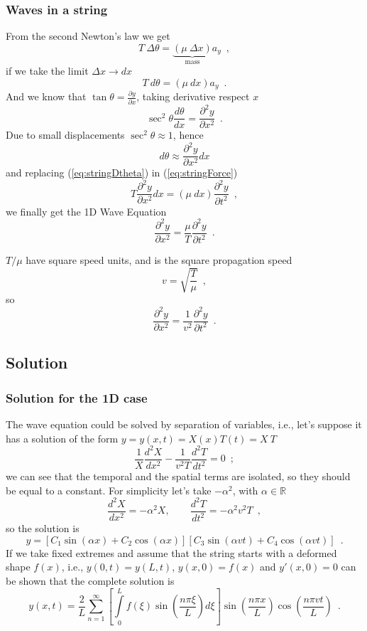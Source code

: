 \documentclass{beamer}
\begin{document}
\begin{frame}[allowframebreaks]\frametitle{Waves in a string}		
From the second Newton's law we get
\[T\ \Delta \theta = \underbrace{(\mu\ \Delta x)}_\text{mass} a_y \enspace ,\]
if we take the limit $\Delta x \rightarrow dx$
\begin{equation}
T\ d\theta = (\mu\ dx) a_y \enspace .
\label{eq:stringForce}
\end{equation}
And we know that $\tan \theta = \frac{\partial y}{\partial x}$, taking derivative respect $x$
\[\sec^2 \theta \frac{d\theta}{dx} = \frac{\partial^2 y}{\partial x^2} \enspace .\]
Due to small displacements $\sec^2 \theta \approx 1$, hence
\begin{equation}
d\theta \approx \frac{\partial^2 y}{\partial x^2} dx
\label{eq:stringDtheta}
\end{equation}
and replacing (\ref{eq:stringDtheta}) in  (\ref{eq:stringForce})
\[T \frac{\partial^2 y}{\partial x^2} dx = (\mu\ dx) \frac{\partial^2 y}{\partial t^2} \enspace ,\]
we finally get the 1D Wave Equation
\[\frac{\partial^2 y}{\partial x^2} = \frac{\mu}{T} \frac{\partial^2 y}{\partial t^2} \enspace .\]

$T/\mu$ have square speed units, and is the square propagation speed
\[v = \sqrt{\frac{T}{\mu}} \enspace ,\]
so
\begin{equation}
\frac{\partial^2 y}{\partial x^2} = \frac{1}{v^2} \frac{\partial^2 y}{\partial t^2} \enspace .
\label{eq:wave_eq}
\end{equation}

\end{frame}


\subsection{Solution}
\begin{frame}[allowframebreaks]\frametitle{Solution for the 1D case}
	
The wave equation could be solved by separation of variables, i.e., let's suppose it has a solution of the form $y=y(x,t)=X(x)T(t)=X\ T$
\[\frac{1}{X} \frac{d^2 X}{dx^2} - \frac{1}{v^2 T} \frac{d^2 T}{dt^2} = 0 \enspace ;\]
we can see that the temporal and the spatial terms are isolated, so they should be equal to a constant. For simplicity let's take $-\alpha^2$, with $\alpha\in \mathbb{R}$
\[\frac{d^2 X}{dx^2}=-\alpha^2 X, \qquad \frac{d^2 T}{dt^2}=-\alpha^2 v^2 T \enspace ,\]
so the solution is
\[y = \left[C_1 \sin(\alpha x)+ C_2\cos(\alpha x) \right] \left[C_3\sin(\alpha v t) +C_4 \cos(\alpha v t)\right] \enspace .\]
If we take fixed extremes and assume that the string starts with a deformed shape $f(x)$, i.e., $y(0,t)=y(L,t)$, $y(x,0)=f(x)$ and $y'(x,0)=0$ can be shown that the complete solution is
\[y(x,t) = \frac{2}{L}\sum\limits_{n=1}^{\infty}\left[\int\limits_{0}^{L}f(\xi)\sin\left(\frac{n\pi\xi}{L}\right)d\xi\right] \sin\left(\frac{n\pi x}{L}\right)\cos\left(\frac{n\pi v t}{L}\right) \enspace .\] 
\end{frame}
\end{document}
